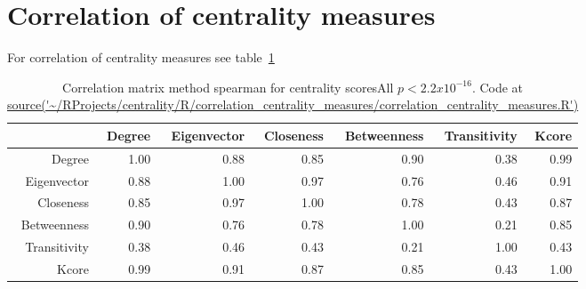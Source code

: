  

\section{Correlation of centrality measures}

For correlation of centrality measures see table~\ref{tab:Correlation between vertex centrality measures for PSP. Spearman's rho}


 



\begin{table}[ht]
\centering
\begin{tabular}{rrrrrrr}
  \hline
 & Degree & Eigenvector & Closeness & Betweenness & Transitivity & Kcore \\ 
  \hline
Degree & 1.00 & 0.88 & 0.85 & 0.90 & 0.38 & 0.99 \\ 
  Eigenvector & 0.88 & 1.00 & 0.97 & 0.76 & 0.46 & 0.91 \\ 
  Closeness & 0.85 & 0.97 & 1.00 & 0.78 & 0.43 & 0.87 \\ 
  Betweenness & 0.90 & 0.76 & 0.78 & 1.00 & 0.21 & 0.85 \\ 
  Transitivity & 0.38 & 0.46 & 0.43 & 0.21 & 1.00 & 0.43 \\ 
  Kcore & 0.99 & 0.91 & 0.87 & 0.85 & 0.43 & 1.00 \\ 
   \hline
\end{tabular}
\caption{Correlation matrix method spearman for centrality scoresAll $p < 2.2 x 10^{-16}$. Code at \url{source('~/RProjects/centrality/R/correlation_centrality_measures/correlation_centrality_measures.R')}}
\label{tab:Correlation between vertex centrality measures for PSP. Spearman's rho}
\end{table}

